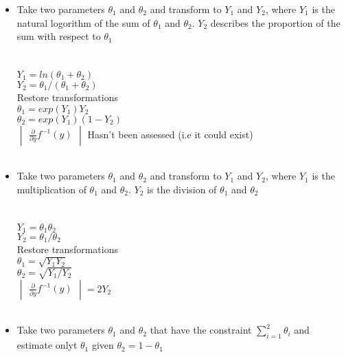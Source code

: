 \begin{itemize}
\item {} Take two parameters $\theta_1$ and $\theta_2$ and transform to $Y_1$ and $Y_2$, where $Y_1$ is the natural logorithm of the sum of $\theta_1$ and $\theta_2$. $Y_2$ describes the proportion of the sum with respect to $\theta_1$\\
\\
\\
$Y_1 = ln(\theta_1 + \theta_2)$\\
$Y_2 = \theta_1 / (\theta_1 + \theta_2)$\\
Restore transformations\\
$\theta_1 = exp(Y_1)Y_2$\\
$\theta_2 =exp(Y_1)(1 - Y_2)$\\
$\begin{vmatrix} \frac{\partial}{\partial y} f^{-1}(y) \end{vmatrix}$ Hasn't been assessed (i.e it could exist)\\\\

\item {} Take two parameters $\theta_1$ and $\theta_2$ and transform to $Y_1$ and $Y_2$, where $Y_1$ is the multiplication of $\theta_1$ and $\theta_2$. $Y_2$ is the division of $\theta_1$ and $\theta_2$\\
\\
\\
$Y_1 = \theta_1 \theta_2$\\
$Y_2 = \theta_1 / \theta_2$\\
Restore transformations\\
$\theta_1 = \sqrt{Y_1 Y_2}$\\
$\theta_2 = \sqrt{Y_1 / Y_2}$\\
$\begin{vmatrix} \frac{\partial}{\partial y} f^{-1}(y) \end{vmatrix} = 2Y_2$\\\\

\item {} Take two parameters $\theta_1$ and $\theta_2$ that have the constraint $\sum_{i = 1}^2\theta_i$ and estimate onlyt $\theta_1$ given $\theta_2 = 1 - \theta_1$\\
\\
\\
\end{itemize}
